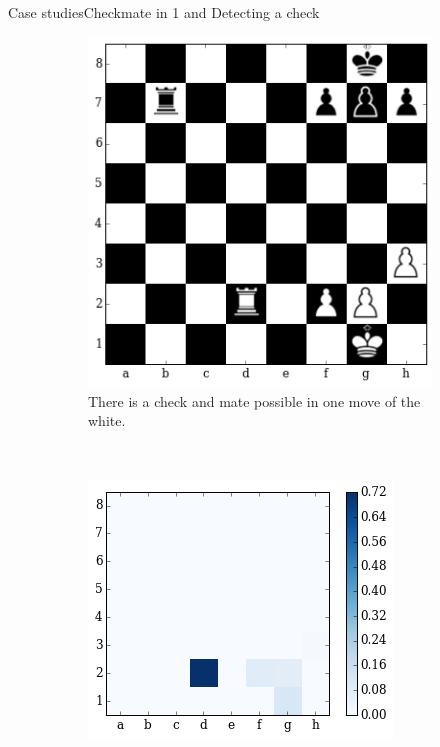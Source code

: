 \documentclass[9pt, unknownkeysallowed]{beamer}
\begin{document}
\begin{frame}{Case studies}{Checkmate in 1 and Detecting a check}
\begin{figure}[H] 
  \centering
    \begin{subfigure}[t]{0.3\textwidth}
        \centering
        
      \includegraphics[width=\textwidth]{../img/best_moves/output_21_0.png}
        \caption{There is a check and mate 
possible in one move of the white.}
    \end{subfigure}
    ~
    \begin{subfigure}[t]{0.3\textwidth}
        \centering
        \includegraphics[width=\textwidth]{../img/best_moves/output_21_2.png}

\end{subfigure}
\end{figure}
\end{frame}
\end{document}
